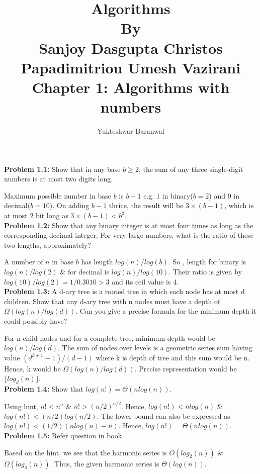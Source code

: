 \documentclass[11pt]{article}
\title{Algorithms\\By\\Sanjoy Dasgupta Christos Papadimitriou Umesh Vazirani \\ Chapter 1: Algorithms with numbers}
\author{Yukteshwar Baranwal}
\begin{document}
	\maketitle
	
	\textbf{Problem 1.1:} Show that in any base $b \geq 2$, the sum of any three single-digit numbers is at
	most two digits long.
	
	Maximum possible number in base $b$ is $b-1$ e.g. 1 in binary($b = 2$) and 9 in decimal($b=10$). On adding $b-1$ thrice, the result will be $3\times (b-1)$, which is at most 2 bit long as $3\times (b-1) < b^3$.\\
	
	\textbf{Problem 1.2:} Show that any binary integer is at most four times as long as the corresponding decimal integer. For very large numbers, what is the ratio of these two lengths,	approximately?
	
	A number of $n$ in base $b$ has length $log(n)/log(b)$. So , length for binary is $log(n)/log(2)$ \& for decimal is $log(n)/log(10)$. Their ratio is given by $log(10)/log(2) = 1/0.3010 > 3$ and its ceil value is 4.\\
	
	\textbf{Problem 1.3:} A d-ary tree is a rooted tree in which each node has at most d children. Show that any d-ary tree with n nodes must have a depth of $\Omega(log(n)/log(d))$. Can you give a precise formula for the minimum depth it could possibly have?
	
	For n child nodes and for a complete tree, minimum depth would be $log(n)/log(d)$. The sum of nodes over levels is a geometric series sum having value $(d^{k+1}-1)/(d-1)$ where k is depth of tree and this sum would be n. Hence, k would be $\Omega(log(n)/log(d))$. Precise representation would be $\lfloor log_d(n)\rfloor$.\\
	
	\textbf{Problem 1.4:} Show that $log(n!) = \Theta(nlog(n))$.
	
	Using hint, $n! < n^n$ \& $n! > (n/2)^{n/2}$. Hence, $log(n!) < nlog(n)$ \& $log(n!) < (n/2)log(n/2)$. The lower bound can also be expressed as $log(n!) < (1/2)(nlog(n) - n)$. Hence, $log(n!) = \Theta(nlog(n))$.\\
	
	\textbf{Problem 1.5:} Refer question in book.
	
	Based on the hint, we see that the harmonic series is $O(log_2(n))$ \& $\Omega(log_4(n))$. Thus, the given  harmonic series is $\Theta(log(n))$.\\
	
\end{document}
